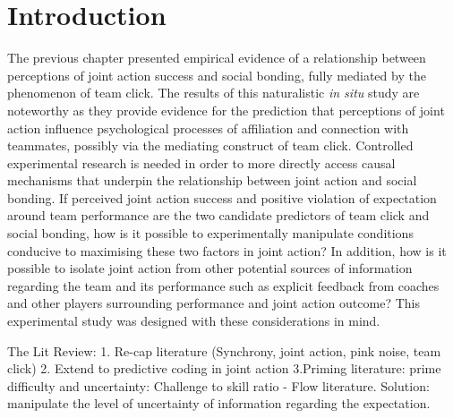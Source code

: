 %


\section{Introduction}

The previous chapter presented empirical evidence of a relationship between perceptions of joint action success and social bonding, fully mediated by the phenomenon of team click.  The results of this naturalistic \textit{in situ} study are noteworthy as they provide evidence for the prediction that perceptions of joint action influence psychological processes of affiliation and connection with teammates, possibly via the mediating construct of team click.  Controlled experimental research is needed in order to more directly access causal mechanisms that underpin the relationship between joint action and social bonding.  If perceived joint action success and positive violation of expectation around team performance are the two candidate predictors of team click and social bonding, how is it possible to experimentally manipulate conditions conducive to maximising these two factors in joint action? In addition, how is it possible to isolate joint action from other potential sources of information regarding the team and its performance such as explicit feedback from coaches and other players surrounding performance and joint action outcome? This experimental study was designed with these considerations in mind.



The Lit Review:
1. Re-cap literature (Synchrony, joint action, pink noise, team click)
2. Extend to predictive coding in joint action
3.Priming literature: prime difficulty and uncertainty:
          Challenge to skill ratio - Flow literature.
Solution: manipulate the level of uncertainty of information regarding the expectation.




